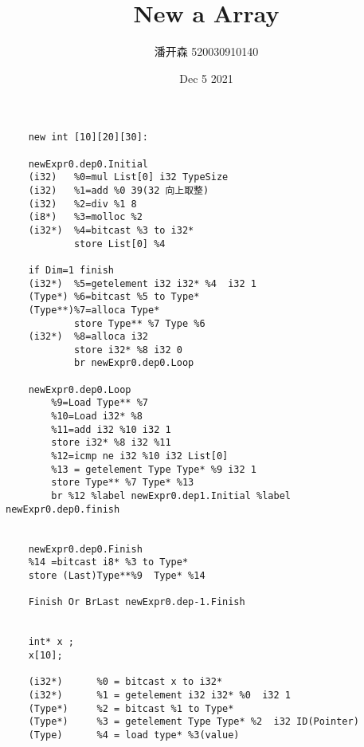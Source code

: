 \documentclass{article}
\title{New a Array}
\author{潘开森 520030910140}
\date{Dec 5 2021}
\begin{document}
\maketitle
\begin{verbatim} 
    new int [10][20][30]:

    newExpr0.dep0.Initial
    (i32)   %0=mul List[0] i32 TypeSize 
    (i32)   %1=add %0 39(32 向上取整)
    (i32)   %2=div %1 8
    (i8*)   %3=molloc %2
    (i32*)  %4=bitcast %3 to i32*
            store List[0] %4

    if Dim=1 finish
    (i32*)  %5=getelement i32 i32* %4  i32 1
    (Type*) %6=bitcast %5 to Type*
    (Type**)%7=alloca Type*
            store Type** %7 Type %6
    (i32*)  %8=alloca i32
            store i32* %8 i32 0
            br newExpr0.dep0.Loop
    
    newExpr0.dep0.Loop
        %9=Load Type** %7 
        %10=Load i32* %8
        %11=add i32 %10 i32 1
        store i32* %8 i32 %11
        %12=icmp ne i32 %10 i32 List[0]
        %13 = getelement Type Type* %9 i32 1
        store Type** %7 Type* %13
        br %12 %label newExpr0.dep1.Initial %label newExpr0.dep0.finish
    
        
    newExpr0.dep0.Finish
    %14 =bitcast i8* %3 to Type* 
    store (Last)Type**%9  Type* %14
    
    Finish Or BrLast newExpr0.dep-1.Finish


    int* x ;
    x[10];
    
    (i32*)      %0 = bitcast x to i32*
    (i32*)      %1 = getelement i32 i32* %0  i32 1
    (Type*)     %2 = bitcast %1 to Type* 
    (Type*)     %3 = getelement Type Type* %2  i32 ID(Pointer)
    (Type)      %4 = load type* %3(value)
    
    
    
\end{verbatim}
\end{document}
